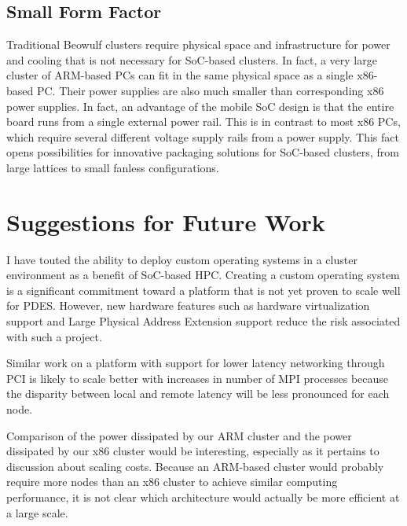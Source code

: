 \documentclass[11pt]{book}
\begin{document}
\subsection{\textbf{Small Form Factor}}

Traditional Beowulf clusters require physical space and infrastructure for power
and cooling that is not necessary for SoC-based clusters. In fact, a very large
cluster of ARM-based PCs can fit in the same physical space as a single
x86-based PC. Their power supplies are also much smaller than corresponding x86
power supplies. In fact, an advantage of the mobile SoC design is that the
entire board runs from a single external power rail. This is in contrast to most
x86 PCs, which require several different voltage supply rails from a power
supply. This fact opens possibilities for innovative packaging solutions for
SoC-based clusters, from large lattices to small fanless configurations.

\section{\textbf{Suggestions for Future Work}}

I have touted the ability to deploy custom operating systems in a cluster
environment as a benefit of SoC-based HPC. Creating a custom operating
system is a significant commitment toward a platform that is not yet proven to
scale well for PDES. However, new hardware features such as hardware
virtualization support and Large Physical Address Extension support reduce the
risk associated with such a project.

Similar work on a platform with support for lower latency networking through PCI
is likely to scale better with increases in number of MPI processes because the
disparity between local and remote latency will be less pronounced for each
node.

Comparison of the power dissipated by our ARM cluster and the power dissipated
by our x86 cluster would be interesting, especially as it pertains to discussion
about scaling costs. Because an ARM-based cluster would probably require more
nodes than an x86 cluster to achieve similar computing performance, it is not
clear which architecture would actually be more efficient at a large scale.

\newpage
 

\end{document}
